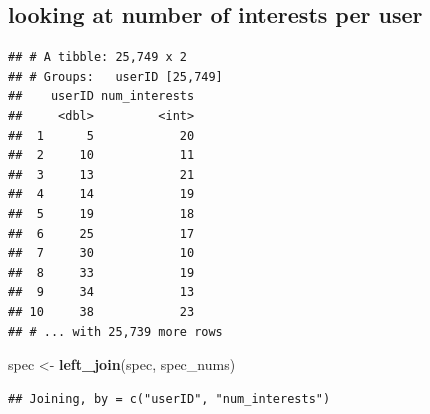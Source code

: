 \documentclass[]{article}
\newenvironment{Shaded}{\begin{snugshade}}{\end{snugshade}}
\newcommand{\DataTypeTok}[1]{\textcolor[rgb]{0.13,0.29,0.53}{#1}}
\newcommand{\DecValTok}[1]{\textcolor[rgb]{0.00,0.00,0.81}{#1}}
\newcommand{\KeywordTok}[1]{\textcolor[rgb]{0.13,0.29,0.53}{\textbf{#1}}}
\newcommand{\NormalTok}[1]{#1}
\newcommand{\OperatorTok}[1]{\textcolor[rgb]{0.81,0.36,0.00}{\textbf{#1}}}
\newcommand{\StringTok}[1]{\textcolor[rgb]{0.31,0.60,0.02}{#1}}
\begin{document}
\hypertarget{looking-at-number-of-interests-per-user}{%
\subsection{looking at number of interests per
user}\label{looking-at-number-of-interests-per-user}}

\begin{Shaded}
\end{Shaded}

\begin{verbatim}
## # A tibble: 25,749 x 2
## # Groups:   userID [25,749]
##    userID num_interests
##     <dbl>         <int>
##  1      5            20
##  2     10            11
##  3     13            21
##  4     14            19
##  5     19            18
##  6     25            17
##  7     30            10
##  8     33            19
##  9     34            13
## 10     38            23
## # ... with 25,739 more rows
\end{verbatim}

\begin{Shaded}
\begin{Highlighting}[]
\NormalTok{spec <-}\StringTok{ }\KeywordTok{left_join}\NormalTok{(spec, spec_nums)}
\end{Highlighting}
\end{Shaded}

\begin{verbatim}
## Joining, by = c("userID", "num_interests")
\end{verbatim}

\begin{Shaded}
\end{Shaded}
\end{document}
